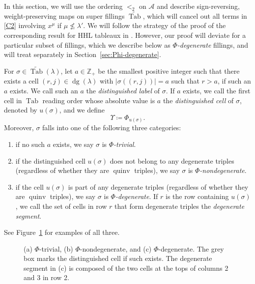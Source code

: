 \documentclass[ALCO,Unicode]{cedram}
\DeclareMathOperator{\PQT}{Tab}
\DeclareMathOperator{\dg}{dg}
\DeclareMathOperator{\quinv}{quinv}
\newcommand\cell[3]{
\def\i{#1} \def\j{#2} \def\entry{#3}

\draw (\j-1,-\i)--(\j,-\i)--(\j,-\i+1)--(\j-1,-\i+1)--(\j-1,-\i);
\node at (\j-.5,-\i+.5) {\entry};
}
\newcommand\graycell[3]{
\def\i{#1} \def\j{#2} \def\entry{#3}
\draw[fill=gray!60](\j-1,-\i)--(\j,-\i)--(\j,-\i+1)--(\j-1,-\i+1)--(\j-1,-\i);
\node at (\j-.5,-\i+.5) {\entry};
}
\begin{document}
In this section, we will use the ordering $<_2$ on $\mathcal{A}$ and describe sign-reversing, weight-preserving maps on super fillings $\widetilde{\PQT}$, which will cancel out all terms in \eqref{C2} involving $x^{\mu}$ if $\mu \not\leq \lambda'$. We will follow the strategy of the proof of the corresponding result for HHL tableaux in \cite[Section 5.2]{HHL05}. 
However, our proof will deviate for a particular subset of fillings, which we describe below as \emph{$\Phi$-degenerate} fillings, and will treat separately in Section~\ref{sec:Phi-degenerate}.

\begin{defn}
For $\sigma\in\widetilde{\PQT}(\lambda)$, let $a\in\mathbb{Z}_+$ be the smallest positive integer such that there exists a cell $(r,j)\in\dg(\lambda)$ with $|\sigma((r,j))|=a$ such that $r>a$, if such an $a$ exists. We call such an $a$ the \emph{distinguished label} of $\sigma$. 
If $a$ exists, we call the first cell in $\PQT$ reading order whose absolute value is $a$ the \emph{distinguished cell} of $\sigma$, denoted by $u(\sigma)$, and we define 
\[\Upsilon\coloneqq\Phi_{u(\sigma)}.
\]
Moreover, $\sigma$ falls into one of the following three categories:
\begin{enumerate}[label=(\alph*),leftmargin=20pt]
\item if no such $a$ exists, we say $\sigma$ is \emph{$\Phi$-trivial}.
\item if the distinguished cell $u(\sigma)$ does not belong to any degenerate triples \textup{(}regardless of whether they are $\quinv$ triples\textup{)}, we say $\sigma$ is \emph{$\Phi$-nondegenerate}.
\item if the cell $u(\sigma)$ is part of any degenerate triples \textup{(}regardless of whether they are $\quinv$ triples\textup{)}, we say $\sigma$ is \emph{$\Phi$-degenerate}. If $r$ is the row containing $u(\sigma)$, we call the set of cells in row $r$ that form degenerate triples the \emph{degenerate segment}.
\end{enumerate}
See Figure~\ref{fig:degenerate} for examples of all three.
\end{defn}

\begin{figure}[h]
\centering
{}
\quad
{}
\quad
{}
\caption{(a) $\Phi$-trivial, (b) $\Phi$-nondegenerate, and (c) $\Phi$-degenerate. The grey box marks the distinguished cell if such exists. The degenerate segment in (c) is composed of the two cells at the tops of columns 2 and 3 in row 2.}\label{fig:degenerate}
\end{figure}
\end{document}
